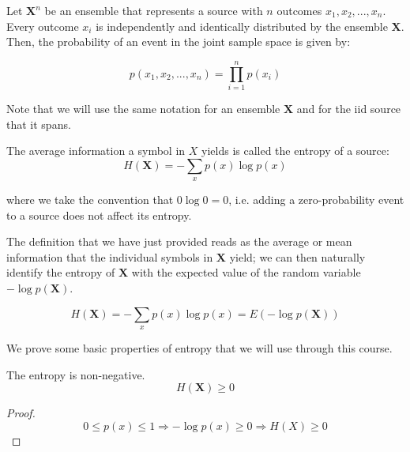 \label{subsec:entropy}
Let $\mathbf{X}^n$ be an ensemble that represents a source with $n$ outcomes $x_1, x_2, ..., x_n$. Every outcome $x_i$ is independently and identically distributed by the ensemble $\mathbf{X}$. Then, the probability of an event in the joint sample space is given by:

\begin{equation}
p(x_1, x_2, ..., x_n)=\prod_{i=1}^np(x_i)
\end{equation}

Note that we will use the same notation for an ensemble $\mathbf{X}$ and for the {iid} source that it spans.

\begin{definition}The average information a symbol in $X$ yields is called the entropy of a source:         
        \begin{equation}\label{eq:entr}
        H(\mathbf{X})=-\sum_{x} p(x)\log p(x)   
        \end{equation}
\end{definition}

\noindent where we take the convention that $0\log 0=0$, i.e. adding a  zero-probability event to a source does not affect its entropy.
 
The definition that we have just provided reads as the average or mean information that the individual symbols in $\mathbf{X}$ yield; we can then naturally identify the entropy of $\mathbf{X}$ with the expected value of the random variable $-\log p(\mathbf{X})$.

\begin{equation}
  \label{eq:mean}
  H(\mathbf{X})=-\sum_{x} p(x)\log p(x) = E(-\log p(\mathbf{X}))
\end{equation}

We prove some basic properties of entropy that we will use through this course.

\begin{lemma}The entropy is non-negative.
  \label{lem:entropynonnegative}
  \begin{equation*}
    H(\mathbf{X})\geq 0
  \end{equation*}
\end{lemma}

\begin{proof}
  \begin{equation}
    0 \leq p(x) \leq 1 \Rightarrow -\log p(x) \geq 0 \Rightarrow H(X) \geq 0
  \end{equation}
\end{proof}

